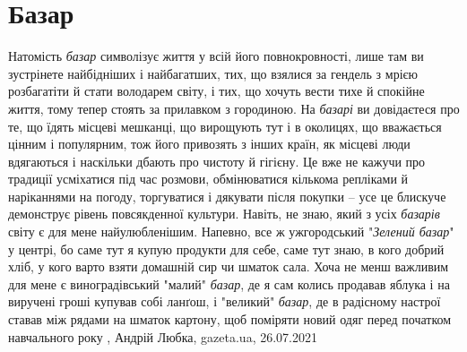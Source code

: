  
 
 
 
 
\chapter{Базар}
\label{sec:slova.bazar}

Натомість \emph{базар} символізує життя у всій його повнокровності, лише там ви
зустрінете найбідніших і найбагатших, тих, що взялися за гендель з мрією
розбагатіти й стати володарем світу, і тих, що хочуть вести тихе й спокійне
життя, тому тепер стоять за прилавком з городиною. На \emph{базарі} ви
довідаєтеся про те, що їдять місцеві мешканці, що вирощують тут і в околицях,
що вважається цінним і популярним, тож його привозять з інших країн, як місцеві
люди вдягаються і наскільки дбають про чистоту й гігієну. Це вже не кажучи про
традиції усміхатися під час розмови, обмінюватися кількома репліками й
наріканнями на погоду, торгуватися і дякувати після покупки – усе це блискуче
демонструє рівень повсякденної культури. Навіть, не знаю, який з усіх
\emph{базарів} світу є для мене найулюбленішим. Напевно, все ж ужгородський
"\emph{Зелений базар}" у центрі, бо саме тут я купую продукти для себе, саме
тут знаю, в кого добрий хліб, у кого варто взяти домашній сир чи шматок сала.
Хоча не менш важливим для мене є виноградівський "малий" \emph{базар}, де я сам
колись продавав яблука і на виручені гроші купував собі ланґош, і "великий"
\emph{базар}, де в радісному настрої ставав між рядами на шматок картону, щоб
поміряти новий одяг перед початком навчального року
, 
Андрій Любка, gazeta.ua, 26.07.2021
